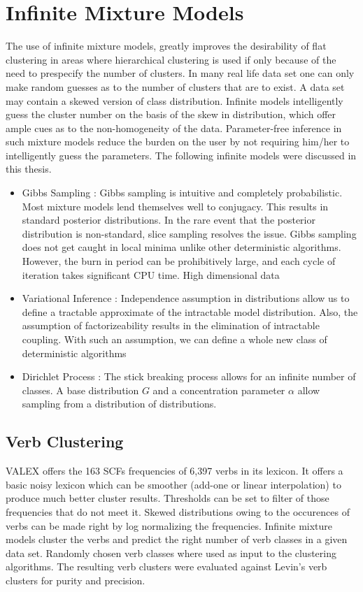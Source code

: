 
\chapter{Infinite Mixture Models}
The use of infinite mixture models, greatly improves the desirability of flat clustering
in areas where hierarchical clustering is used if only because of the need to prespecify 
the number of clusters. In many real life data set one can only make random guesses as to
the number of clusters that are to exist. A data set may contain a skewed version of class
distribution. Infinite models intelligently guess the cluster number on the basis of the 
skew in distribution, which offer ample cues as to the non-homogeneity of the data.
Parameter-free inference in such mixture models reduce the burden
on the user by not requiring him/her to intelligently guess the parameters. The following infinite
models were discussed in this thesis.
\begin{itemize}
\item Gibbs Sampling : Gibbs sampling is intuitive and completely probabilistic. Most 
mixture models lend themselves well to conjugacy. This results in standard posterior distributions.
In the rare event that the posterior distribution is non-standard, slice sampling resolves the issue.
Gibbs sampling does not get caught in local minima unlike other deterministic algorithms. However,
the burn in period can be prohibitively large, and each cycle of iteration takes significant CPU time.
High dimensional data 
\item Variational Inference : Independence assumption in distributions allow us to define a tractable
approximate of the intractable model distribution. Also, the assumption of factorizeability results 
in the elimination of intractable coupling. With such an assumption, we can define a whole new class
of deterministic algorithms
\item Dirichlet Process : The stick breaking process allows for an infinite number of classes. A base
distribution $G$ and a concentration parameter $\alpha$ allow sampling  from 
a distribution of distributions. 
\end{itemize}

\section{Verb Clustering}

VALEX offers the 163 SCFs frequencies of 6,397 verbs in its lexicon. It offers a basic noisy lexicon
which can be smoother (add-one or linear interpolation) to produce much better cluster results. Thresholds
can be set to filter of those frequencies that do not meet it. Skewed distributions owing to the occurences
of verbs can be made right by log normalizing the frequencies. Infinite mixture models cluster the verbs
and predict the right number of verb classes in a given data set. Randomly chosen verb classes where used as
input to the clustering algorithms. The resulting verb clusters were evaluated against Levin's verb clusters
for purity and precision.

